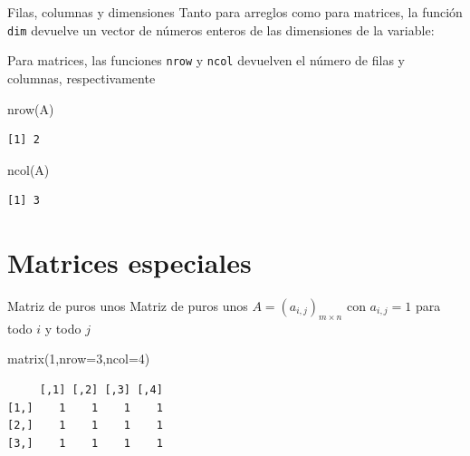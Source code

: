 \documentclass[
  ignorenonframetext,
  aspectratio=169,
  spanish,
]{beamer}
\newenvironment{Shaded}{\begin{snugshade}}{\end{snugshade}}
\newcommand{\AttributeTok}[1]{\textcolor[rgb]{0.40,0.45,0.13}{#1}}
\newcommand{\DecValTok}[1]{\textcolor[rgb]{0.68,0.00,0.00}{#1}}
\newcommand{\FunctionTok}[1]{\textcolor[rgb]{0.28,0.35,0.67}{#1}}
\newcommand{\NormalTok}[1]{\textcolor[rgb]{0.00,0.23,0.31}{#1}}
\begin{document}
\begin{frame}[fragile]{Filas, columnas y dimensiones}
\label{filas-columnas-y-dimensiones}
Tanto para arreglos como para matrices, la función \texttt{dim} devuelve
un vector de números enteros de las dimensiones de la variable:

Para matrices, las funciones \texttt{nrow} y \texttt{ncol} devuelven el
número de filas y columnas, respectivamente

\begin{Shaded}
\begin{Highlighting}[]
\FunctionTok{nrow}\NormalTok{(A)}
\end{Highlighting}
\end{Shaded}

\begin{verbatim}
[1] 2
\end{verbatim}

\begin{Shaded}
\begin{Highlighting}[]
\FunctionTok{ncol}\NormalTok{(A)}
\end{Highlighting}
\end{Shaded}

\begin{verbatim}
[1] 3
\end{verbatim}
\end{frame}

\section{Matrices especiales}\label{matrices-especiales}

\begin{frame}[fragile]{Matriz de puros unos}
\label{matriz-de-puros-unos}
Matriz de puros unos \(A=(a_{i,j})_{m\times n}\) con \(a_{i,j}=1\) para
todo \(i\) y todo \(j\)

\begin{Shaded}
\begin{Highlighting}[]
\FunctionTok{matrix}\NormalTok{(}\DecValTok{1}\NormalTok{,}\AttributeTok{nrow=}\DecValTok{3}\NormalTok{,}\AttributeTok{ncol=}\DecValTok{4}\NormalTok{)}
\end{Highlighting}
\end{Shaded}

\begin{verbatim}
     [,1] [,2] [,3] [,4]
[1,]    1    1    1    1
[2,]    1    1    1    1
[3,]    1    1    1    1
\end{verbatim}
\end{frame}
\end{document}
